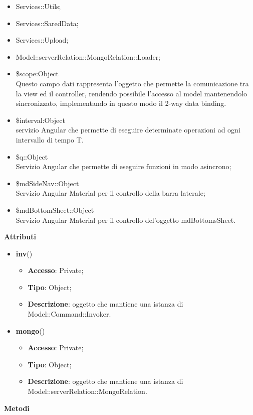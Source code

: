{{\begin{itemize}
		\item Services::Utils;
		\item Services::SaredData;
		\item Services::Upload;
		\item Model::\-serverRelation::\-MongoRelation::\-Loader;
		\item \$scope:Object\\
			\indent Questo campo dati rappresenta l’oggetto che permette la comunicazione tra la view ed il controller, rendendo possibile l’accesso al model mantenendolo sincronizzato, implementando in questo modo il 2-way data binding.
		\item \$interval:Object\\
			\indent servizio Angular che permette di eseguire determinate operazioni ad ogni intervallo di tempo T.
		\item \$q::Object\\
			\indent Servizio Angular che permette di eseguire funzioni in modo asincrono;
		\item \$mdSideNav::Object\\
			\indent Servizio Angular Material per il controllo della barra laterale;
		\item \$mdBottomSheet::Object\\
			\indent Servizio Angular Material per il controllo del'oggetto mdBottomsSheet.
	\end{itemize}
	\textbf{Attributi}\\
	\begin{itemize}
		\item \textbf{inv}()
		\begin{itemize}
			\item \textbf{Accesso}: Private;
			\item \textbf{Tipo}: Object;
			\item \textbf{Descrizione}: oggetto che mantiene una istanza di Model::\-Command::\-Invoker.
		\end{itemize}
		\item \textbf{mongo}()
		\begin{itemize}
			\item \textbf{Accesso}: Private;
			\item \textbf{Tipo}: Object;
			\item \textbf{Descrizione}: oggetto che mantiene una istanza di Model::\-serverRelation::\-MongoRelation.
		\end{itemize}
    \end{itemize}
	\textbf{Metodi}
}}
